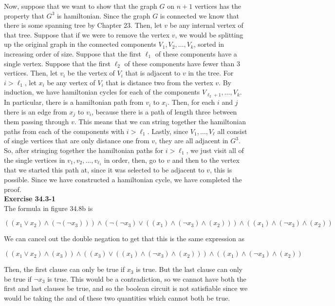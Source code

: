 \documentclass{article}
\begin{document}
Now, suppose that we want to show that the graph $G$ on $n+1$ vertices has the property that $G^3$ is hamiltonian. Since the graph $G$ is connected we know that there is some spanning tree by Chapter 23. Then, let $v$ be any internal vertex of that tree. Suppose that  if we were to remove the vertex $v$, we would be splitting up the original graph in the connected components $V_1, V_2,\ldots, V_k$, sorted in increasing order of size. Suppose that the first $\ell_1$ of these components have a single vertex. Suppose that the first $\ell_2$ of these components have fewer than $3$ vertices. Then, let $v_i$ be the vertex of $V_i$ that is adjacent to $v$ in the tree. For $i>\ell_1$, let $x_i$ be any vertex of $V_i$ that is distance two from the vertex $v$. By induction, we have hamiltonian cycles for each of the components $V_{\ell_2+1}, \ldots, V_k$. In particular, there is a hamiltonian path from $v_i$ to $x_i$. Then, for each $i$ and $j$ there is an edge from $x_j$ to $v_i$, because there is a path of length three between them passing through $v$. This means that we can string together the hamiltonian paths from each of the components with $i>\ell_1$. Lastly, since $V_1, \ldots, V_{\ell}$ all consist of single vertices that are only distance one from $v$, they are all adjacent in $G^3$. So, after stringing together the hamiltonian paths for $i>\ell_1$, we just visit all of the single vertices in $v_1,v_2,\ldots, v_{\ell_1}$ in order, then, go to $v$ and then to the vertex that we started this path at, since it was selected to be adjacent to $v$, this is possible. Since we have constructed a hamiltonian cycle, we have completed the proof.\\


\noindent\textbf{Exercise 34.3-1}\\

The formula in figure 34.8b is 

\[((x_1\vee x_2)\wedge(\neg(\neg x_3)))\wedge(\neg(\neg x_3) \vee ((x_1)\wedge(\neg x_3)\wedge(x_2)))\wedge((x_1)\wedge(\neg x_3)\wedge(x_2))\]

We can cancel out the double negation to get that this is the same expression as

\[((x_1\vee x_2)\wedge(x_3))\wedge(( x_3) \vee ((x_1)\wedge(\neg x_3)\wedge(x_2)))\wedge((x_1)\wedge(\neg x_3)\wedge(x_2))\]

Then, the first clause can only be true if $x_3$ is true. But the last clause can only be true if $\neg x_3$ is true. This would be a contradiction, so we cannot have both the first and last clauses be true, and so the boolean circuit is not satisfiable since we would be taking the and of these two quantities which cannot both be true.\\
\end{document}
